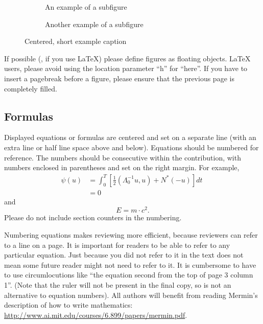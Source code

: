 \documentclass[runningheads]{llncs}
\begin{document}
\begin{figure}[tb]
  \centering
  \begin{subfigure}{0.68\linewidth}
    \fbox{\rule{0pt}{2in} \rule{.9\linewidth}{0pt}}
    \caption{An example of a subfigure}
    \label{fig:short-a}
  \end{subfigure}
  \hfill
  \begin{subfigure}{0.28\linewidth}
    \fbox{\rule{0pt}{2in} \rule{.9\linewidth}{0pt}}
    \caption{Another example of a subfigure}
    \label{fig:short-b}
  \end{subfigure}
  \caption{Centered, short example caption}
  \label{fig:short}
\end{figure}

If possible (\eg, if you use \LaTeX) please define figures as floating objects. 
\LaTeX{} users, please avoid using the location parameter ``h'' for ``here''. 
If you have to insert a pagebreak before a figure, please ensure that the previous page is completely filled.


\subsection{Formulas}
Displayed equations or formulas are centered and set on a separate line (with an extra line or half line space above and below). 
Equations should be numbered for reference. 
The numbers should be consecutive within the contribution, with numbers enclosed in parentheses and set on the right margin.
For example,
\begin{align}
  \psi (u) & = \int_{0}^{T} \left[\frac{1}{2}
  \left(\Lambda_{0}^{-1} u,u\right) + N^{\ast} (-u)\right] dt \; \\
& = 0
\end{align}
and 
\begin{equation}
  E = m\cdot c^2.
  \label{eq:important}
\end{equation}
Please do not include section counters in the numbering.

Numbering equations makes reviewing more efficient, because reviewers can refer to a line on a page.  
It is important for readers to be able to refer to any particular equation.
Just because you did not refer to it in the text does not mean some future reader might not need to refer to it.
It is cumbersome to have to use circumlocutions like ``the equation second from the top of page 3 column 1''.
(Note that the ruler will not be present in the final copy, so is not an alternative to equation numbers).
All authors will benefit from reading Mermin's description of how to write mathematics:
\url{http://www.ai.mit.edu/courses/6.899/papers/mermin.pdf}.
\end{document}
